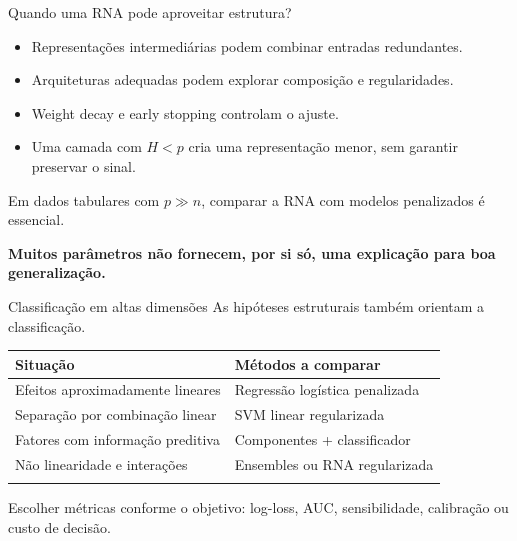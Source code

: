 \documentclass[
  10pt,
  ignorenonframetext,
  aspectratio=169,
  brazilian,
]{beamer}
\newcounter{none} %
\providecommand{\tightlist}{%
  \setlength{\itemsep}{0pt}\setlength{\parskip}{0pt}}
\begin{document}
\begin{frame}{Quando uma RNA pode aproveitar estrutura?}
\protect{}\label{quando-uma-rna-pode-aproveitar-estrutura}
\begin{itemize}
\tightlist
\item
  Representações intermediárias podem combinar entradas redundantes.
\item
  Arquiteturas adequadas podem explorar composição e regularidades.
\item
  Weight decay e early stopping controlam o ajuste.
\item
  Uma camada com \(H<p\) cria uma representação menor, sem garantir
  preservar o sinal.
\end{itemize}

Em dados tabulares com \(p\gg n\), comparar a RNA com modelos
penalizados é essencial.

\textbf{Muitos parâmetros não fornecem, por si só, uma explicação para
boa generalização.}

\end{frame}

\begin{frame}{Classificação em altas dimensões}
\protect{}\label{classificauxe7uxe3o-em-altas-dimensuxf5es}
As hipóteses estruturais também orientam a classificação.

{\def\LTcaptype{none} %
\begin{longtable}[]{@{}ll@{}}
\toprule\noalign{}
Situação & Métodos a comparar \\
\midrule\noalign{}
\endhead
Efeitos aproximadamente lineares & Regressão logística penalizada \\
Separação por combinação linear & SVM linear regularizada \\
Fatores com informação preditiva & Componentes + classificador \\
Não linearidade e interações & Ensembles ou RNA regularizada \\
\bottomrule\noalign{}
\end{longtable}
}

Escolher métricas conforme o objetivo: log-loss, AUC, sensibilidade,
calibração ou custo de decisão.
\end{frame}
\end{document}

